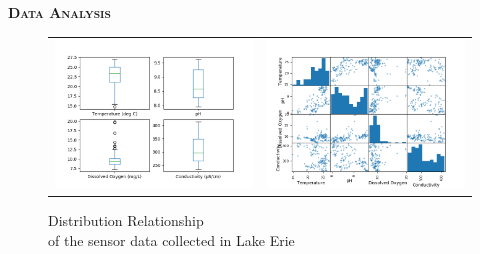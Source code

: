 \documentclass[final,t]{beamer}
\begin{document}
\begin{frame}{}
\begin{columns}
\begin{column}{.33\linewidth}
\begin{block}{\textsc{\textbf{Data Analysis}}}
                    \begin{center}
                    \begin{figure}
                    \begin{tabular}{cc}
                    \includegraphics[scale = 1.3]{assets/plot1}
                    \hspace*{-15mm}
                    &
                    \hspace*{-15mm}
                    \includegraphics[scale = 1.3]{assets/plot3}
                    \end{tabular}
                    \caption{Distribution  \hspace{80mm} Relationship \\ of the sensor data collected in Lake Erie}

\end{figure}
\end{center}
\end{block}
\end{column}
\end{columns}
\end{frame}
\end{document}
